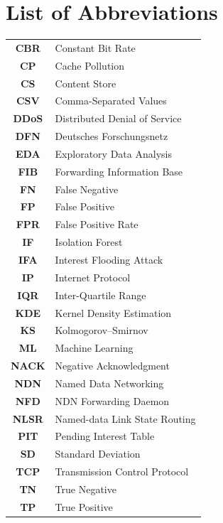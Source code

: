 \documentclass[12pt]{report}
\begin{document}
\tableofcontents
{}

\chapter*{List of Abbreviations}

\begin{tabular}{cl}
\textbf{CBR}   & Constant Bit Rate \\
\textbf{CP}    & Cache Pollution \\
\textbf{CS}    & Content Store \\
\textbf{CSV}   & Comma-Separated Values \\
\textbf{DDoS}  & Distributed Denial of Service \\
\textbf{DFN}   & Deutsches Forschungsnetz \\
\textbf{EDA}   & Exploratory Data Analysis \\
\textbf{FIB}   & Forwarding Information Base \\
\textbf{FN}    & False Negative \\
\textbf{FP}    & False Positive \\
\textbf{FPR}   & False Positive Rate \\
\textbf{IF}    & Isolation Forest \\
\textbf{IFA}   & Interest Flooding Attack \\
\textbf{IP}    & Internet Protocol \\
\textbf{IQR}   & Inter-Quartile Range \\
\textbf{KDE}   & Kernel Density Estimation \\
\textbf{KS}    & Kolmogorov--Smirnov \\
\textbf{ML}    & Machine Learning \\
\textbf{NACK}  & Negative Acknowledgment \\
\textbf{NDN}   & Named Data Networking \\
\textbf{NFD}   & NDN Forwarding Daemon \\
\textbf{NLSR}  & Named-data Link State Routing \\
\textbf{PIT}   & Pending Interest Table \\
\textbf{SD}    & Standard Deviation \\
\textbf{TCP}   & Transmission Control Protocol \\
\textbf{TN}    & True Negative \\
\textbf{TP}    & True Positive \\
\end{tabular}
\end{document}
